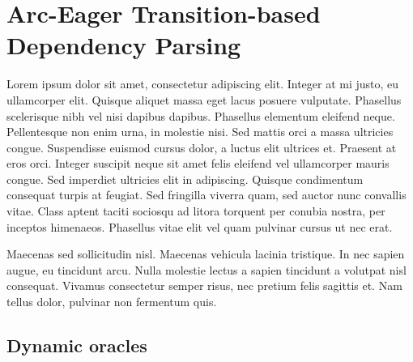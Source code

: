 \documentclass[11pt,letterpaper]{article}
\begin{document}
\section{Arc-Eager Transition-based Dependency Parsing}
Lorem ipsum dolor sit amet, consectetur adipiscing elit. Integer at mi justo, eu ullamcorper elit. Quisque aliquet massa eget lacus posuere vulputate. Phasellus scelerisque nibh vel nisi dapibus dapibus. Phasellus elementum eleifend neque. Pellentesque non enim urna, in molestie nisi. Sed mattis orci a massa ultricies congue. Suspendisse euismod cursus dolor, a luctus elit ultrices et. Praesent at eros orci. Integer suscipit neque sit amet felis eleifend vel ullamcorper mauris congue. Sed imperdiet ultricies elit in adipiscing. Quisque condimentum consequat turpis at feugiat. Sed fringilla viverra quam, sed auctor nunc convallis vitae. Class aptent taciti sociosqu ad litora torquent per conubia nostra, per inceptos himenaeos. Phasellus vitae elit vel quam pulvinar cursus ut nec erat.

Maecenas sed sollicitudin nisl. Maecenas vehicula lacinia tristique. In nec sapien augue, eu tincidunt arcu. Nulla molestie lectus a sapien tincidunt a volutpat nisl consequat. Vivamus consectetur semper risus, nec pretium felis sagittis et. Nam tellus dolor, pulvinar non fermentum quis.

\subsection{Dynamic oracles}
\end{document}
